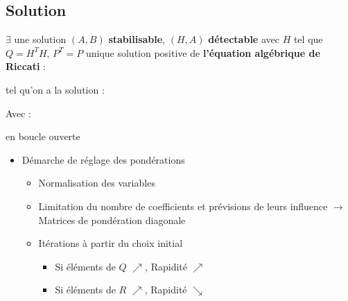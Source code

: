 {{{\subsection{Solution}
$\exists$ une solution $(A,B)$ \textbf{stabilisable}, $(H,A)$ \textbf{détectable} avec $H$ tel que $Q = H^{T}H$, $P^{T} = P$ unique solution positive de \textbf{l'équation algébrique de Riccati} : 
\begin{center}
    \Large{}
\end{center}
\large{tel qu'on a la solution :}
\begin{center}
    \Large{}
\end{center}
Avec :
\begin{center}
    \Large{} en boucle ouverte
\end{center}
\newpage
\begin{itemize}
    \item Démarche de réglage des pondérations
    \begin{itemize}
        \item Normalisation des variables
        \item Limitation du nombre de coefficients et prévisions de leurs influence $\longrightarrow$ Matrices de pondération diagonale
        \item Itérations à partir du choix initial
        \begin{itemize}
            \item \textcolor{BrickRed}{Si éléments de $Q$ $\nearrow$, Rapidité $\nearrow$}
            \item \textcolor{BrickRed}{Si éléments de $R$ $\nearrow$, Rapidité $\searrow$} 
        \end{itemize}
    \end{itemize}
\end{itemize}
}}}
